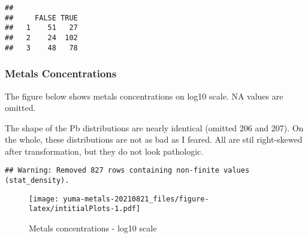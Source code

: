 \documentclass[]{article}
\newenvironment{Shaded}{\begin{snugshade}}{\end{snugshade}}
\newcommand{\CommentTok}[1]{\textcolor[rgb]{0.56,0.35,0.01}{\textit{#1}}}
\newcommand{\DataTypeTok}[1]{\textcolor[rgb]{0.13,0.29,0.53}{#1}}
\newcommand{\KeywordTok}[1]{\textcolor[rgb]{0.13,0.29,0.53}{\textbf{#1}}}
\newcommand{\NormalTok}[1]{#1}
\newcommand{\OperatorTok}[1]{\textcolor[rgb]{0.81,0.36,0.00}{\textbf{#1}}}
\newcommand{\StringTok}[1]{\textcolor[rgb]{0.31,0.60,0.02}{#1}}
\begin{document}
\begin{verbatim}
##    
##     FALSE TRUE
##   1    51   27
##   2    24  102
##   3    48   78
\end{verbatim}

\hypertarget{metals-concentrations}{%
\subsubsection{Metals Concentrations}\label{metals-concentrations}}

The figure below shows metals concentrations on log10 scale. NA values
are omitted.

The shape of the Pb distributions are nearly identical (omitted 206 and
207). On the whole, these distributions are not as bad as I feared. All
are stil right-skewed after transformation, but they do not look
pathologic.

\begin{Shaded}
\end{Shaded}

\begin{verbatim}
## Warning: Removed 827 rows containing non-finite values (stat_density).
\end{verbatim}

\begin{figure}
\centering
\texttt{[image: yuma-metals-20210821\_files/figure-latex/intitialPlots-1.pdf]}
\caption{Metals concentrations - log10 scale}
\end{figure}
\end{document}
